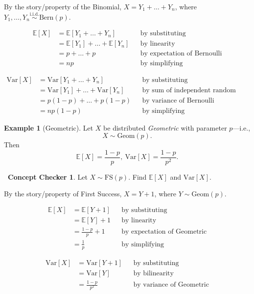 \documentclass[12pt,oneside]{article}
\newcommand{\E}{\mathbb{E}}
\newcommand{\Var}{\text{Var}}
\newcommand{\Bern}{\text{Bern}}
\newcommand{\Geom}{\text{Geom}}
\newcommand{\FS}{\text{FS}}
\newcommand{\simiid}{\overset{\text{i.i.d.}}{\sim}}
\theoremstyle{definition}
\newtheorem{example}{Example}
\newtheorem{concept}{\faPen \ Concept Checker}
\theoremstyle{remark}
\begin{document}
\begin{solutionbox}
By the story/property of the Binomial, $X = Y_1 + \ldots + Y_n$, where $Y_1, \ldots, Y_n \simiid \Bern(p)$.

\[
\begin{aligned}
\E[X] &= \E[Y_1 + \ldots + Y_n] && \text{by substituting} \\
&= \E[Y_1] + \ldots + \E[Y_n] && \text{by linearity} \\
&= p + \ldots + p && \text{by expectation of Bernoulli} \\
&= n p && \text{by simplifying }
\end{aligned}
\]

\[
\begin{aligned}
\Var[X] &= \Var[Y_1 + \ldots + Y_n] && \text{by substituting} \\
&= \Var[Y_1] + \ldots + \Var[Y_n] && \text{by sum of independent random variables} \\
&= p (1 - p) + \ldots + p (1 - p) && \text{by variance of Bernoulli} \\
&= n p (1 - p) && \text{by simplifying }
\end{aligned}
\]
\end{solutionbox}

\begin{example}[Geometric]
Let $X$ be distributed \textit{Geometric} with parameter $p$—i.e., \[X \sim \Geom(p).\] Then \[\E[X] = \frac{1 - p}{p}, \ \Var[X] = \frac{1 - p}{p^2}.\]
\end{example}

\begin{concept}
Let $X \sim \FS(p)$. Find $\E[X]$ and $\Var[X]$.
\end{concept}

\begin{solutionbox}
By the story/property of First Success, $X = Y + 1$, where $Y \sim \Geom(p)$.

\[
\begin{aligned}
\E[X] &= \E[Y + 1] && \text{by substituting} \\
&= \E[Y] + 1 && \text{by linearity} \\
&= \frac{1 - p}{p} + 1 && \text{by expectation of Geometric} \\
&= \frac{1}{p} && \text{by simplifying }
\end{aligned}
\]

\[
\begin{aligned}
\Var[X] &= \Var[Y + 1] && \text{by substituting} \\
&= \Var[Y] && \text{by bilinearity} \\
&= \frac{1 - p}{p^2} && \text{by variance of Geometric}
\end{aligned}
\]
\end{solutionbox}
\end{document}
